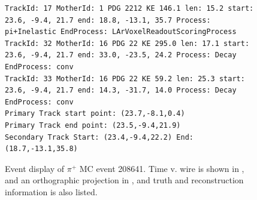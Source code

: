 \documentclass[letterpaper,12pt]{article}
\newcommand{\pip}{\ensuremath{\pi^{+}}}
\begin{document}
\begin{figure}[!hbtp]
\begin{center}
\begin{lstlisting}
TrackId: 17 MotherId: 1 PDG 2212 KE 146.1 len: 15.2 start: 23.6, -9.4, 21.7 end: 18.8, -13.1, 35.7 Process: pi+Inelastic EndProcess: LArVoxelReadoutScoringProcess
TrackId: 32 MotherId: 16 PDG 22 KE 295.0 len: 17.1 start: 23.6, -9.4, 21.7 end: 33.0, -23.5, 24.2 Process: Decay EndProcess: conv
TrackId: 33 MotherId: 16 PDG 22 KE 59.2 len: 25.3 start: 23.6, -9.4, 21.7 end: 14.3, -31.7, 14.0 Process: Decay EndProcess: conv
Primary Track start point: (23.7,-8.1,0.4)
Primary Track end point: (23.5,-9.4,21.9)
Secondary Track Start: (23.4,-9.4,22.2) End: (18.7,-13.1,35.8)
\end{lstlisting}
    \caption{%
                Event display of \pip{} MC event 208641. 
                Time v. wire is shown in , 
                and an orthographic projection in ,
                and truth and reconstruction information is also listed.
            }
    \label{fig:evd_pipMC_208641}
  \end{center}
\end{figure}
\end{document}
